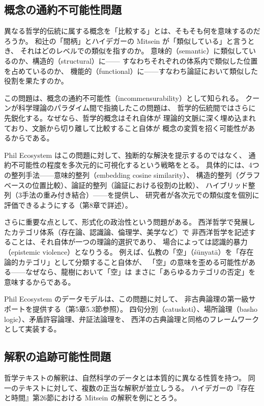 \documentclass[a4paper,11pt]{ltjsarticle}
\begin{document}
\subsection{概念の通約不可能性問題}

異なる哲学的伝統に属する概念を「比較する」とは、そもそも何を意味するのだろうか。
和辻の「間柄」とハイデガーの Mitsein が「類似している」と言うとき、
それはどのレベルでの類似を指すのか。
意味的（semantic）に類似しているのか、構造的（structural）に——
すなわちそれぞれの体系内で類似した位置を占めているのか、
機能的（functional）に——すなわち論証において類似した役割を果たすのか。

この問題は、概念の通約不可能性（incommensurability）として知られる\cite{kuhn1962}。
クーンが科学理論のパラダイム間で指摘したこの問題は、
哲学的伝統間ではさらに先鋭化する。なぜなら、哲学的概念はそれ自体が
理論的文脈に深く埋め込まれており、文脈から切り離して比較すること自体が
概念の変質を招く可能性があるからである。

Phil Ecosystem はこの問題に対して、独断的な解決を提示するのではなく、
通約不可能性の程度を多次元的に可視化するという戦略をとる。
具体的には、4つの整列手法——意味的整列（embedding cosine similarity）、
構造的整列（グラフベースの位置比較）、論証的整列（論証における役割の比較）、
ハイブリッド整列（3手法の重み付き結合）——を提供し、
研究者が各次元での類似度を個別に評価できるようにする（第8章で詳述）。

さらに重要な点として、形式化の政治性という問題がある。
西洋哲学で発展したカテゴリ体系（存在論、認識論、倫理学、美学など）で
非西洋哲学を記述することは、それ自体が一つの理論的選択であり、
場合によっては認識的暴力（epistemic violence）となりうる。
例えば、仏教の「空」（śūnyatā）を「存在論的カテゴリ」として分類すること自体が、
「空」の意味を歪める可能性がある——なぜなら、龍樹において「空」は
まさに「あらゆるカテゴリの否定」を意味するからである\cite{garfield1995}。

Phil Ecosystem のデータモデルは、この問題に対して、
非古典論理の第一級サポートを提供する（第5章5.3節参照）。
四句分別（catuskoti）、場所論理（basho logic）、矛盾許容論理、弁証法論理を、
西洋の古典論理と同格のフレームワークとして実装する。

\subsection{解釈の追跡可能性問題}

哲学テキストの解釈は、自然科学のデータとは本質的に異なる性質を持つ。
同一のテキストに対して、複数の正当な解釈が並立しうる。
ハイデガーの『存在と時間』\cite{heidegger1927}第26節における
Mitsein の解釈を例にとろう。
\end{document}
